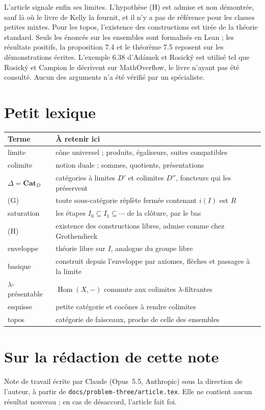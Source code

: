 \documentclass[11pt,a4paper]{amsart}
\theoremstyle{definition}
\theoremstyle{plain}
\theoremstyle{remark}
\newcommand{\Cat}{\mathbf{Cat}}
\newcommand{\Hom}{\operatorname{Hom}}
\begin{document}
L'article signale enfin ses limites. L'hypothèse (H) est admise et non démontrée, sauf là où le livre de Kelly la fournit, et il n'y a pas de référence pour les classes petites mixtes. Pour les topos, l'existence des constructions est tirée de la théorie standard. Seuls les énoncés sur les ensembles sont formalisés en Lean ; les résultats positifs, la proposition 7.4 et le théorème 7.5 reposent sur les démonstrations écrites. L'exemple 6.38 d'Adámek et Rosický est utilisé tel que Rosický et Campion le décrivent sur MathOverflow, le livre n'ayant pas été consulté. Aucun des arguments n'a été vérifié par un spécialiste.

\section{Petit lexique}

{\small\begin{tabular}{@{}p{2.9cm}p{11.9cm}@{}}
\toprule
Terme & À retenir ici \\
\midrule
limite & cône universel ; produits, égaliseurs, suites compatibles \\
colimite & notion duale ; sommes, quotients, présentations \\
$\Delta=\Cat_D$ & catégories à limites $D'$ et colimites $D''$, foncteurs qui les préservent \\
(G) & toute sous-catégorie réplète fermée contenant $i(I)$ est $R$ \\
saturation & les étapes $I_0\subseteq I_1\subseteq\cdots$ de la clôture, par le bas \\
(H) & existence des constructions libres, admise comme chez Grothendieck \\
enveloppe & théorie libre sur $I$, analogue du groupe libre \\
basique & construit depuis l'enveloppe par axiomes, flèches et passages à la limite \\
$\lambda$-présentable & $\Hom(X,-)$ commute aux colimites $\lambda$-filtrantes \\
esquisse & petite catégorie et cocônes à rendre colimites \\
topos & catégorie de faisceaux, proche de celle des ensembles \\
\bottomrule
\end{tabular}}

\section*{Sur la rédaction de cette note}

Note de travail écrite par Claude (Opus~5.5, Anthropic) sous la direction de l'auteur, à partir de \texttt{docs/problem-three/article.tex}. Elle ne contient aucun résultat nouveau ; en cas de désaccord, l'article fait foi.
\end{document}
